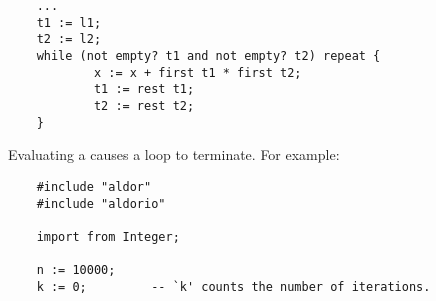 \begin{small}
\begin{verbatim}
    ...
    t1 := l1;
    t2 := l2;
    while (not empty? t1 and not empty? t2) repeat {
            x := x + first t1 * first t2;
            t1 := rest t1;
            t2 := rest t2;
    }
\end{verbatim}
\end{small}



Evaluating a  causes a loop to terminate.  For
example:

\begin{small}
\begin{verbatim}
    #include "aldor"
    #include "aldorio"

    import from Integer;

    n := 10000;
    k := 0;         -- `k' counts the number of iterations.

\end{verbatim}
\end{small}

